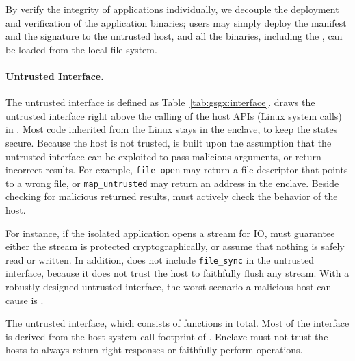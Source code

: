 By verify the integrity of applications individually,
we decouple the deployment and verification of the application binaries;
users may simply deploy the manifest and the signature to the untrusted host,
and all the binaries, including the \libos{}, can be loaded from the local file system.

\paragraph{Untrusted Interface.}
The untrusted interface is defined as Table~\ref{tab:gsgx:interface}.
\graphenesgx{} draws the untrusted interface right above the calling
of the host APIs (Linux system calls) in \pal{}.
Most code inherited from the \graphene{} Linux \pal{} stays in
the enclave, to keep the states secure.
Because the host is not trusted,
\graphenesgx{} is built upon the assumption that the untrusted interface
can be exploited to
pass malicious arguments, or return incorrect results.
For example, {\tt file\_open} may return a file descriptor that points
to a wrong file, or {\tt map\_untrusted} may return an address in the enclave. 
Beside checking for malicious returned results,
\graphenesgx{} must actively check the behavior of the host.

For instance, if the isolated application opens a stream for IO,
\graphenesgx{} must guarantee either the stream is protected cryptographically,
or assume that nothing is safely read or written.
In addition, \graphenesgx{} does not include {\tt file\_sync} in the untrusted interface,
because it does not trust the host to faithfully flush any stream.
With a robustly designed untrusted interface,
the worst scenario a malicious host can cause is .


\begin{table}[t!]
\centering

\caption[The \graphenesgx{} untrusted interface]
{The \graphenesgx{} untrusted interface, which consists of \interfacenum{} functions in total.
Most of the interface is derived from the host system call footprint of
\graphene{} \libos{}. Enclave must not trust the hosts to
always return right responses or faithfully perform operations.}
\label{tab:gsgx:interface}
\end{table}

